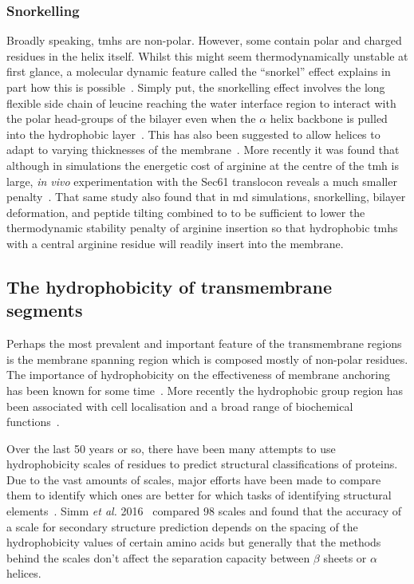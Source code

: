\subsubsection{Snorkelling}

Broadly speaking, \gls{tmh}s are non-polar.
However, some contain polar and charged residues in the helix itself.
Whilst this might seem thermodynamically unstable at first glance, a molecular dynamic feature called the ``snorkel'' effect explains in part how this is possible~\cite{Chamberlain2004, Strandberg2003}.
Simply put, the snorkelling effect involves the long flexible side chain of leucine reaching the water interface region to interact with the polar head-groups of the bilayer even when the $\alpha$ helix backbone is pulled into the hydrophobic layer~\cite{Krishnakumar2007}.
This has also been suggested to allow helices to adapt to varying thicknesses of the membrane~\cite{Kandasamy2006}.
More recently it was found that although in simulations the energetic cost of arginine at the centre of the \gls{tmh} is large, \textit{in vivo} experimentation with the Sec61 translocon reveals a much smaller penalty~\cite{Ulmschneider2017}.
That same study also found that in \gls{md} simulations, snorkelling, bilayer deformation, and peptide tilting combined to to be sufficient to lower the thermodynamic stability penalty of arginine insertion so that hydrophobic \gls{tmh}s with a central arginine residue will readily insert into the membrane.


\subsection{The hydrophobicity of transmembrane segments}\label{ssection:hydrophobicityscales}

Perhaps the most prevalent and important feature of the transmembrane regions is the membrane spanning region which is composed mostly of non-polar residues.
The importance of hydrophobicity on the effectiveness of membrane anchoring has been known for some time~\cite{Davis1985}.
More recently the hydrophobic group region has been associated with cell localisation and a broad range of biochemical functions~\cite{Junne2010, Sharpe2010, Wong2012}.

Over the last 50 years or so, there have been many attempts to use hydrophobicity scales of residues to predict structural classifications of proteins.
Due to the vast amounts of scales, major efforts have been made to compare them to identify which ones are better for which tasks of identifying structural elements~\cite{Simm2016, Peters2014}.
Simm \textit{ et al.} 2016~\cite{Simm2016} compared 98 scales and found that the accuracy of a scale for secondary structure prediction depends on the spacing of the hydrophobicity values of certain amino acids but generally that the methods behind the scales don't affect the separation capacity between $ \beta $ sheets or $ \alpha $ helices.

